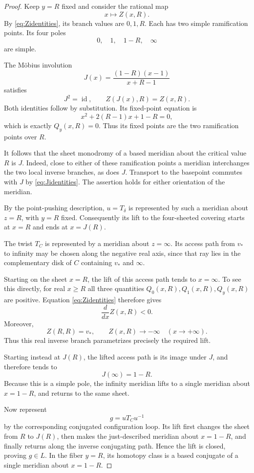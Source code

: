\documentclass[11pt]{article}
\newcommand{\id}{\operatorname{id}}
\theoremstyle{definition}
\theoremstyle{remark}
\begin{document}
\begin{proof}
Keep $y=R$ fixed and consider the rational map
\[
x\longmapsto Z(x,R).
\]
By \eqref{eq:Zidentities}, its branch values are $0,1,R$.
Each has two simple ramification points.  Its four poles
\[
0,\quad1,\quad1-R,\quad\infty
\]
are simple.

The M\"obius involution
\begin{equation}\label{eq:involution}
J(x)=\frac{(1-R)(x-1)}{x+R-1}
\end{equation}
satisfies
\begin{equation}\label{eq:Jidentities}
J^2=\id,\qquad Z(J(x),R)=Z(x,R).
\end{equation}
Both identities follow by substitution.  Its fixed-point equation is
\[
x^2+2(R-1)x+1-R=0,
\]
which is exactly $Q_y(x,R)=0$.
Thus its fixed points are the two ramification points over $R$.

It follows that the sheet monodromy of a based meridian about the
critical value $R$ is $J$.  Indeed, close to either of these
ramification points a meridian interchanges the two local inverse
branches, as does $J$.  Transport to the basepoint commutes with
$J$ by \eqref{eq:Jidentities}.  The assertion holds for either
orientation of the meridian.

By the point-pushing description, $u=T_\delta$ is represented by such
a meridian about $z=R$, with $y=R$ fixed.  Consequently its lift to
the four-sheeted covering starts at $x=R$ and ends at $x=J(R)$.

The twist $T_C$ is represented by a meridian about $z=\infty$.
Its access path from $v_*$ to infinity may be chosen along the negative
real axis, since that ray lies in the complementary disk of $C$
containing $v_*$ and $\infty$.

Starting on the sheet $x=R$, the lift of this access path tends to
$x=\infty$.  To see this directly, for real $x\ge R$ all three
quantities $Q_0(x,R),Q_1(x,R),Q_y(x,R)$ are positive.
Equation \eqref{eq:Zidentities} therefore gives
\[
\frac{d}{dx}Z(x,R)<0.
\]
Moreover,
\[
Z(R,R)=v_*,\qquad Z(x,R)\longrightarrow-\infty
\quad(x\longrightarrow+\infty).
\]
Thus this real inverse branch parametrizes precisely the required
lift.

Starting instead at $J(R)$, the lifted access path is its image under
$J$, and therefore tends to
\[
J(\infty)=1-R.
\]
Because this is a simple pole, the infinity meridian lifts to a
single meridian about $x=1-R$, and returns to the same sheet.

Now represent
\[
g=uT_Cu^{-1}
\]
by the corresponding conjugated configuration loop.  Its lift first
changes the sheet from $R$ to $J(R)$, then makes the just-described
meridian about $x=1-R$, and finally returns along the inverse
conjugating path.  Hence the lift is closed, proving $g\in L$.
In the fiber $y=R$, its homotopy class is a based conjugate of a
single meridian about $x=1-R$.


\end{proof}
\end{document}

